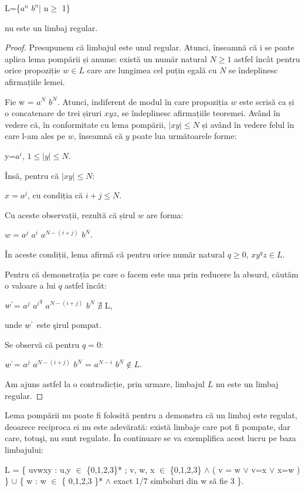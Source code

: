 L=\{$a^{n}$ $b^{n}$| n$\geq$ 1\}

nu este un limbaj regular.

\begin{proof}
Presupunem că limbajul este unul regular. Atunci, înseamnă că i se poate aplica lema pompării și anume: există un număr natural $N \ge 1$ astfel încât pentru orice propoziție $w \in L$ care are lungimea cel puțin egală cu $N$ se îndeplinesc afirmațiile lemei.

Fie w = $a^{N}$ $b^{N}$. Atunci, indiferent de modul în care propoziția $w$ este scrisă ca și o concatenare de trei șiruri $xyz$, se îndeplinesc afirmațiile teoremei. Având în vedere că, în conformitate cu lema pompării, $|xy| \le N$ și având în vedere felul în care l-am ales pe $w$, înseamnă că $y$ poate lua următoarele forme:

y=$a^{i}$, $1 \leq |y| \leq N$.

Însă, pentru că $|xy| \leq N$:

$x=a^{j}$, cu condiția că $i+j \leq N$.

Cu aceste observații, rezultă că șirul $w$ are forma:  

$w=a^{j}$ $a^{i}$ $a^{N-(i+j)}$ $b^{N}$.

În aceste condiții, lema afirmă că pentru orice număr natural $q \ge 0$, $x y^q z \in L$.

Pentru că demonstrația pe care o facem este una prin reducere la absurd, căutăm o valoare a lui $q$ astfel încât: 

$w^{`}$= $a^{j}$ ${a^{i}}^{q}$ $a^{N-(i+j)}$ $b^{N}$ $\nexists$ L, 

unde  $w^{`}$ este şirul pompat. 

Se observă că pentru $q=0$: 

$w^{`}$= $a^{j}$ $a^{N-(i+j)}$ $b^{N}$ = $a^{N-i}$ $b^{N} \notin L$.

Am ajuns astfel la o contradicție, prin urmare, limbajul $L$ nu este un limbaj regular.
\end{proof}

Lema pompării nu poate fi folosită pentru a demonstra că un limbaj este regulat, deoarece reciproca ei nu este adevărată: există limbaje care pot fi pompate, dar care, totuşi, nu sunt regulate. În continuare se va exemplifica acest lucru pe baza limbajului:

L = \{ uvwxy : u,y $\in$ \{0,1,2,3\}* ; v, w, x $\in$ \{0,1,2,3\} $\wedge$ ( v = w $\vee$ v=x $\vee$ x=w ) \} $\cup$ \{ w : w $\in$ \{ 0,1,2,3 \}* $\wedge$  exact 1/7 simboluri din w să fie 3 \}.

